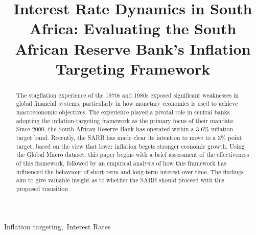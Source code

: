 \documentclass[11pt,preprint]{elsarticle}
\numberwithin{equation}{section}
\numberwithin{figure}{section}
\numberwithin{table}{section}
\begin{document}
\begin{frontmatter}  %

\title{Interest Rate Dynamics in South Africa: Evaluating the South
African Reserve Bank's Inflation Targeting Framework}












\begin{abstract}
\small{
The stagflation experience of the 1970s and 1980s exposed significant
weaknesses in global financial systems, particularly in how monetary
economics is used to achieve macroeconomic objectives. The experience
played a pivotal role in central banks adopting the inflation-targeting
framework as the primary focus of their mandate. Since 2000, the South
African Reserve Bank has operated within a 3-6\% inflation target band.
Recently, the SARB has made clear its intention to move to a 3\% point
target, based on the view that lower inflation begets stronger economic
growth. Using the Global Macro dataset, this paper begins with a brief
assessment of the effectiveness of this framework, followed by an
empirical analysis of how this framework has influenced the behaviour of
short-term and long-term interest over time. The findings aim to give
valuable insight as to whether the SARB should proceed with this
proposed transition
}
\end{abstract}

\vspace{1cm}


\begin{keyword}
\footnotesize{
Inflation targeting,~Interest Rates \\
\vspace{0.3cm}
}
\end{keyword}



\vspace{0.5cm}

\end{frontmatter}

\setcounter{footnote}{0}



\pagestyle{fancy}
\chead{}
\rhead{}
\lfoot{}
\lhead{}
\cfoot{}
\end{document}
